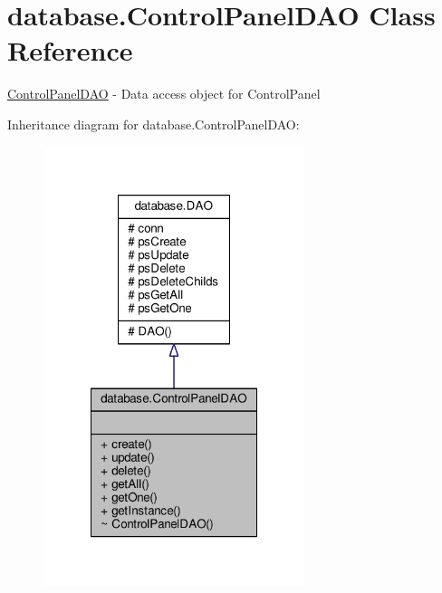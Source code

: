 \hypertarget{classdatabase_1_1ControlPanelDAO}{\section{database.\-Control\-Panel\-D\-A\-O Class Reference}
\label{classdatabase_1_1ControlPanelDAO}
}


\hyperlink{classdatabase_1_1ControlPanelDAO}{Control\-Panel\-D\-A\-O} -\/ Data access object for Control\-Panel  




Inheritance diagram for database.\-Control\-Panel\-D\-A\-O\-:\nopagebreak
\begin{figure}[H]
\begin{center}
\leavevmode
\includegraphics[width=216pt]{classdatabase_1_1ControlPanelDAO__inherit__graph}
\end{center}
\end{figure}


